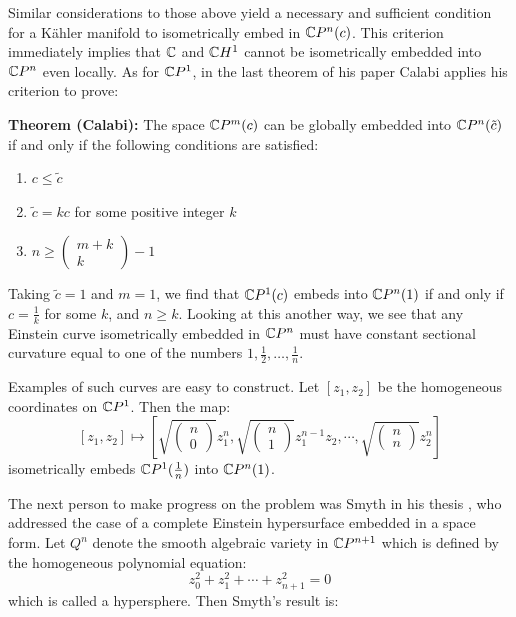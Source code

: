 Similar considerations to those above yield a necessary and sufficient condition for a K\"{a}hler manifold to isometrically embed in $\mathbb{C}P^n(c)$.   This criterion immediately implies that $\mathbb{C}$ and $\mathbb{C}H^1$ cannot be isometrically embedded into $\mathbb{C}P^n$ even locally.  As for $\mathbb{C}P^1$, in the last theorem of his paper Calabi applies his criterion to prove:

{\bf Theorem (Calabi):} The space $\mathbb{C}P^{m}(c)$ can be globally embedded into $\mathbb{C}P^{n}(\tilde{c})$ if and only if the following conditions are satisfied:
\begin{enumerate}
\item $c \leq \tilde{c}$
\item $\tilde{c} = k c$ for some positive integer $k$
\item $ n \geq \left( \begin{array}{c} m + k \\ k \end{array} \right) - 1 $
\end{enumerate}

Taking $\tilde{c} = 1$ and $m = 1$, we find that $\mathbb{C}P^1(c)$ embeds into $\mathbb{C}P^n(1)$ if and only if $c = \frac{1}{k}$ for some $k$, and $n \geq k$.  Looking at this another way, we see that any Einstein curve isometrically embedded in $\mathbb{C}P^{n}$ must have constant sectional curvature equal to one of the numbers $1, \frac{1}{2}, \ldots, \frac{1}{n}$.

Examples of such curves are easy to construct.  Let $[z_1, z_2]$ be the homogeneous coordinates on $\mathbb{C}P^1$.  Then the map:
%
$$ [z_1, z_2] \mapsto \left[ \sqrt{ \left( \begin{array}{c} n \\ 0 \end{array} \right) } z_1^n, \sqrt{ \left( \begin{array}{c} n \\ 1 \end{array} \right) } z_1^{n-1} z_2, \cdots, \sqrt{ \left( \begin{array}{c} n \\ n \end{array} \right) } z_2^n \right] $$ 
%
isometrically embeds $\mathbb{C}P^1(\frac{1}{n})$ into $\mathbb{C}P^n(1)$.

The next person to make progress on the problem was Smyth in his thesis \cite{S}, who addressed the case of a complete Einstein hypersurface embedded in a space form.  Let $Q^{n}$ denote the smooth algebraic variety in $\mathbb{C}P^{n+1}$ which is defined by the homogeneous polynomial equation:
%
$$ z_0^2 + z_1^2 + \cdots + z_{n+1}^2 = 0 $$
%
which is called a hypersphere.  Then Smyth's result is:

